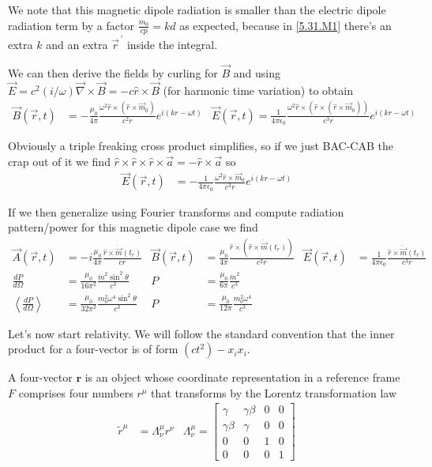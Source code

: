 \documentclass[10pt]{report}
\newcommand{\rd}[2]{\frac{d#1}{d#2}}
\newcommand{\pvec}[1]{\vec{#1}^{\,\prime}}
\newcommand{\expvalue}[1]{\left<#1\right>}
\begin{document}
We note that this magnetic dipole radiation is smaller than the electric dipole radiation term by a factor $\frac{m_0}{cp} = kd$ as expected, because in \eqref{5.31.M1} there's an extra $k$ and an extra $\pvec{r}$ inside the integral. 

We can then derive the fields by curling for $\vec{B}$ and using $\vec{E} = c^2(i/\omega)\vec{\nabla} \times \vec{B} = -c\hat{r} \times \vec{B}$ (for harmonic time variation) to obtain
\begin{align}
    \vec{B}(\vec{r},t) &= -\frac{\mu_0}{4\pi}\frac{\omega^2\hat{r} \times \left( \hat{r} \times \vec{m}_0 \right)}{c^2r}e^{i(kr - \omega t)} & \vec{E}(\vec{r},t) = \frac{1}{4\pi\epsilon_0} \frac{\omega^2 \hat{r} \times \left( \hat{r} \times \left( \hat{r} \times \vec{m}_0 \right) \right)}{c^3r}e^{i(kr - \omega t)}
\end{align}

Obviously a triple freaking cross product simplifies, so if we just BAC-CAB the crap out of it we find $\hat{r} \times \hat{r} \times \hat{r} \times \vec{a} = -\hat{r} \times \vec{a}$ so
\begin{align}
    \vec{E}(\vec{r},t) &= -\frac{1}{4\pi\epsilon_0}\frac{\omega^2 \hat{r} \times \vec{m}_0}{c^3r} e^{i(kr - \omega t)}
\end{align}

If we then generalize using Fourier transforms and compute radiation pattern/power for this magnetic dipole case we find
\begin{align}
    \vec{A}(\vec{r},t) &= -i\frac{\mu_0}{4\pi}\frac{\hat{r} \times \dot{\vec{m}}(t_r)}{cr} & \vec{B}(\vec{r},t) &= \frac{\mu_0}{4\pi}\frac{\hat{r} \times \left( \hat{r} \times \ddot{\vec{m}}(t_r) \right)}{c^2r} & \vec{E}(\vec{r},t) &= \frac{1}{4\pi\epsilon_0} \frac{\hat{r} \times \ddot{\vec{m}}(t_r)}{c^3r}\\
    \rd{P}{\Omega} &= \frac{\mu_0}{16\pi^2}\frac{\ddot{m}^2 \sin^2\theta}{c^3} & P &= \frac{\mu_0}{6\pi}\frac{\ddot{m}^2}{c^3}\\
    \expvalue{\rd{P}{\Omega}} &= \frac{\mu_0}{32\pi^2}\frac{m_0^2\omega^4 \sin^2\theta}{c^3} & P &= \frac{\mu_0}{12\pi}\frac{m_0^2 \omega^4}{c^3}
\end{align}

Let's now start relativity. We will follow the standard convention that the inner product for a four-vector is of form $(ct^2) - x_ix_i$.

A four-vector $\mathbf{r}$ is an object whose coordinate representation in a reference frame $F$ comprises four numbers $r^\mu$ that transforms by the Lorentz transformation law
\begin{align}
    \tilde{r}^\mu &= \Lambda^\mu_\nu r^\nu & \Lambda^\mu_\nu = \begin{bmatrix} \gamma & \gamma\beta & 0 & 0\\ \gamma \beta & \gamma & 0 & 0 \\0 & 0 & 1 & 0\\0 & 0 & 0 & 1\end{bmatrix} 
\end{align}
\end{document}
